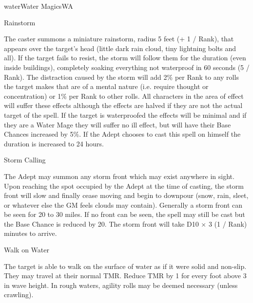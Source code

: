 \begin{College}[1.3]{water}{Water Magics}{WA}
\begin{spell}[S-8]{Rainstorm}
\begin{effects}
The caster summons a miniature rainstorm, radius 5 feet (+ 1 / Rank),
that appears over the target’s head (little dark rain cloud, tiny
lightning bolts and all). If the target fails to resist, the storm
will follow them for the duration (even inside buildings), completely
soaking everything not waterproof in 60 seconds (5 / Rank).  The
distraction caused by the storm will add 2\% per Rank to any rolls
the target makes that are of a mental nature (i.e. require thought or
concentration) or 1\% per Rank to other rolls. All characters in the
area of effect will suffer these effects although the effects are
halved if they are not the actual target of the spell.  If the target
is waterproofed the effects will be minimal and if they are a Water
Mage they will suffer no ill effect, but will have their Base Chances
increased by 5\%. If the Adept chooses to cast this spell on himself
the duration is increased to 24 hours.
\end{effects}
\end{spell}

\begin{spell}[S-9]{Storm Calling}

\begin{effects}
The Adept may summon any storm front which may exist anywhere in
sight. Upon reaching the spot occupied by the Adept at the time of
casting, the storm front will slow and finally cease moving and begin
to downpour (snow, rain, sleet, or whatever else the GM feels clouds
may contain).  Generally a storm front can be seen for 20 to 30
miles. If no front can be seen, the spell may still be cast but the
Base Chance is reduced by 20.  The storm front will take D10 × 3 (1 /
Rank) minutes to arrive.
\end{effects}
\end{spell}

\begin{spell}[S-10]{Walk on Water}
\begin{effects}
The target is able to walk on the surface of water as if it were solid
and non-slip.  They may travel at their normal TMR. Reduce TMR by 1
for every foot above 3 in wave height. In rough waters, agility rolls
may be deemed necessary (unless crawling).
\end{effects}
\end{spell}


\end{College}
